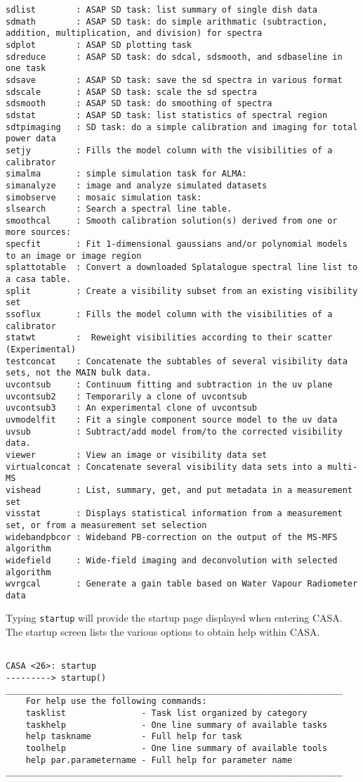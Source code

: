 \begin{verbatim}
sdlist        : ASAP SD task: list summary of single dish data
sdmath        : ASAP SD task: do simple arithmatic (subtraction, addition, multiplication, and division) for spectra
sdplot        : ASAP SD plotting task 
sdreduce      : ASAP SD task: do sdcal, sdsmooth, and sdbaseline in one task
sdsave        : ASAP SD task: save the sd spectra in various format
sdscale       : ASAP SD task: scale the sd spectra
sdsmooth      : ASAP SD task: do smoothing of spectra
sdstat        : ASAP SD task: list statistics of spectral region
sdtpimaging   : SD task: do a simple calibration and imaging for total power data 
setjy         : Fills the model column with the visibilities of a calibrator
simalma       : simple simulation task for ALMA:
simanalyze    : image and analyze simulated datasets
simobserve    : mosaic simulation task:
slsearch      : Search a spectral line table.
smoothcal     : Smooth calibration solution(s) derived from one or more sources:
specfit       : Fit 1-dimensional gaussians and/or polynomial models to an image or image region
splattotable  : Convert a downloaded Splatalogue spectral line list to a casa table.
split         : Create a visibility subset from an existing visibility set
ssoflux       : Fills the model column with the visibilities of a calibrator
statwt        :  Reweight visibilities according to their scatter (Experimental)
testconcat    : Concatenate the subtables of several visibility data sets, not the MAIN bulk data.
uvcontsub     : Continuum fitting and subtraction in the uv plane
uvcontsub2    : Temporarily a clone of uvcontsub
uvcontsub3    : An experimental clone of uvcontsub
uvmodelfit    : Fit a single component source model to the uv data
uvsub         : Subtract/add model from/to the corrected visibility data.
viewer        : View an image or visibility data set
virtualconcat : Concatenate several visibility data sets into a multi-MS
vishead       : List, summary, get, and put metadata in a measurement set
visstat       : Displays statistical information from a measurement set, or from a measurement set selection
widebandpbcor : Wideband PB-correction on the output of the MS-MFS algorithm
widefield     : Wide-field imaging and deconvolution with selected algorithm
wvrgcal       : Generate a gain table based on Water Vapour Radiometer data
\end{verbatim}
\normalsize

Typing {\tt startup} will provide the startup page displayed when
entering CASA. The startup screen lists the various options to obtain
help within CASA.
\small
\begin{verbatim}

CASA <26>: startup
---------> startup()
___________________________________________________________________
    For help use the following commands:
    tasklist               - Task list organized by category
    taskhelp               - One line summary of available tasks
    help taskname          - Full help for task
    toolhelp               - One line summary of available tools
    help par.parametername - Full help for parameter name
___________________________________________________________________


\end{verbatim}
\normalsize

